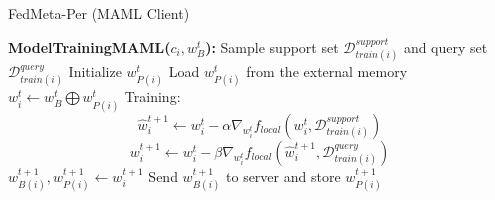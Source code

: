 \documentclass[runningheads]{llncs}
\begin{document}
\begin{algorithm}[h]
    \caption{FedMeta-Per (MAML Client)} \label{alg:fedmaml_per_client}
    \begin{algorithmic}[1]
        \State\textbf{ModelTrainingMAML($c_i, w_B^t$):}
        \State Sample support set $\mathcal{D}_{train(i)}^{support}$ and query set $\mathcal{D}_{train(i)}^{query}$
            \State Initialize $w_{P(i)}^t$
        \Else
            \State Load $w_{P(i)}^t$ from the external memory
        \EndIf
        \State $w_i^t \gets w_B^t \bigoplus w_{P(i)}^t$ 
        \State Training: 
        \begin{dmath*}
            \hat{w}_{i}^{t+1} \gets w_{i}^t - \alpha\nabla_{w_i^t} f_{local}\left(w_{i}^t, \mathcal{D}_{train(i)}^{support}\right)
        \end{dmath*}
        \begin{dmath*}
            w_{i}^{t+1} \gets w_{i}^t - \beta\nabla_{w_i^t} f_{local}\left(\hat{w}_{i}^{t+1}, \mathcal{D}_{train(i)}^{query}\right)
        \end{dmath*}
        \State $w_{B(i)}^{t+1}, w_{P(i)}^{t+1} \gets w_i^{t+1}$ 
        \State Send $w_{B(i)}^{t+1}$ to server and store $w_{P(i)}^{t+1}$
    \end{algorithmic}
\end{algorithm}
\end{document}
